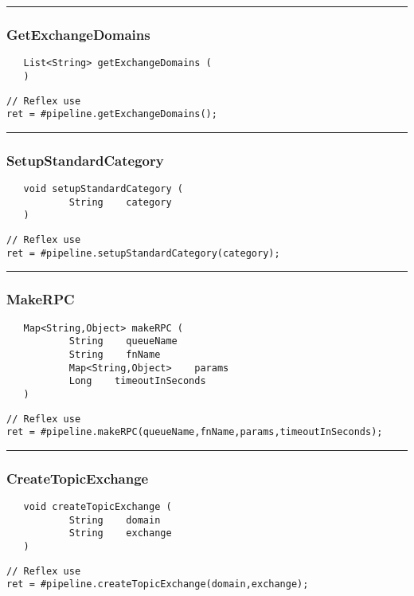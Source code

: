 \rule{15cm}{2pt}
\subsubsection{GetExchangeDomains}
\label{Api:GetExchangeDomains}
\begin{verbatim}
   List<String> getExchangeDomains (
   )
\end{verbatim}
\begin{lstlisting}[language=reflex]
// Reflex use
ret = #pipeline.getExchangeDomains();
\end{lstlisting}



\rule{15cm}{2pt}
\subsubsection{SetupStandardCategory}
\label{Api:SetupStandardCategory}
\begin{verbatim}
   void setupStandardCategory (
           String    category
   )
\end{verbatim}
\begin{lstlisting}[language=reflex]
// Reflex use
ret = #pipeline.setupStandardCategory(category);
\end{lstlisting}



\rule{15cm}{2pt}
\subsubsection{MakeRPC}
\label{Api:MakeRPC}
\begin{verbatim}
   Map<String,Object> makeRPC (
           String    queueName
           String    fnName
           Map<String,Object>    params
           Long    timeoutInSeconds
   )
\end{verbatim}
\begin{lstlisting}[language=reflex]
// Reflex use
ret = #pipeline.makeRPC(queueName,fnName,params,timeoutInSeconds);
\end{lstlisting}



\rule{15cm}{2pt}
\subsubsection{CreateTopicExchange}
\label{Api:CreateTopicExchange}
\begin{verbatim}
   void createTopicExchange (
           String    domain
           String    exchange
   )
\end{verbatim}
\begin{lstlisting}[language=reflex]
// Reflex use
ret = #pipeline.createTopicExchange(domain,exchange);
\end{lstlisting}



